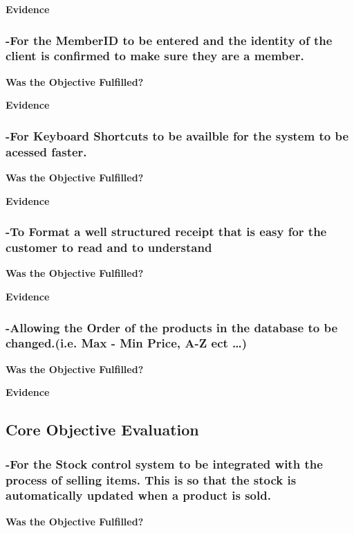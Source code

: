 \textbf{Evidence} \newline





\subsubsection{-For the MemberID to be entered and the identity of the client is confirmed to make sure they are a member.}
\textbf{Was the Objective Fulfilled?} \newline

\textbf{Evidence} \newline




\subsubsection{-For Keyboard Shortcuts to be availble for the system to be acessed faster.}
\textbf{Was the Objective Fulfilled?} \newline

\textbf{Evidence} \newline




\subsubsection{-To Format a well structured receipt that is easy for the customer to read and to understand}
\textbf{Was the Objective Fulfilled?} \newline

\textbf{Evidence} \newline




\subsubsection{-Allowing the Order of the products in the database to be changed.(i.e. Max - Min Price, A-Z ect \ldots)}
\textbf{Was the Objective Fulfilled?} \newline

\textbf{Evidence} \newline


\subsection{Core Objective Evaluation}

\subsubsection{-For the Stock control system to be integrated with the process of selling items. This is so that the stock is automatically updated when a product is sold.}
\textbf{Was the Objective Fulfilled?} \newline

